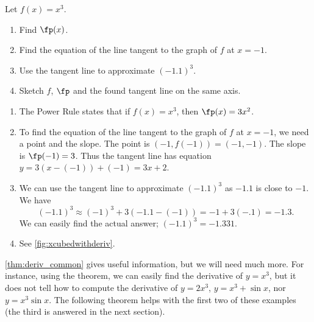 {Let $f(x)=x^3$. 
\begin{enumerate}
	\item	Find $\fp(x)$.
	\item	Find the equation of the line tangent to the graph of $f$ at $x=-1$. 
	\item	Use the tangent line to approximate $(-1.1)^3$.
	\item	Sketch $f$, $\fp$ and the found tangent line on the same axis.
\end{enumerate}}
{\begin{enumerate}
	\item	The Power Rule states that if $f(x) = x^3$, then $\fp(x) = 3x^2$. 
	\item	To find the equation of the line tangent to the graph of $f$ at $x=-1$, we need a point and the slope. The point is $(-1,f(-1)) = (-1, -1)$. The slope is $\fp(-1)= 3$. Thus the tangent line has equation $y = 3(x-(-1))+(-1) = 3x+2$. 

	\item	We can use the tangent line to approximate $(-1.1)^3$ as $-1.1$ is close to $-1$. We have
	\[(-1.1)^3 \approx (-1)^3+3(-1.1-(-1))=-1+3(-.1)= -1.3.\]
	We can easily find the actual answer; $(-1.1)^3 = -1.331$. 
	\item	See \autoref{fig:xcubedwithderiv}.\eoehere
\end{enumerate}}

\autoref{thm:deriv_common} gives useful information, but we will need much more. For instance, using the theorem, we can easily find the derivative of $y=x^3$, but it does not tell how to compute the derivative of $y=2x^3$, $y=x^3+\sin x$, nor $y=x^3\sin x$. The following theorem helps with the first two of these examples (the third is answered in the next section).

